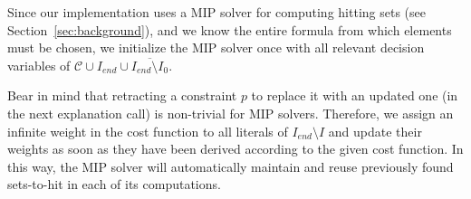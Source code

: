 \documentclass[twoside,11pt]{article}
\newcommand\m[1]{\mathcal{#1}}
\newcommand\comment[1]{\marginpar{\tiny #1}}
\renewcommand\comment[1]{#1}
\newcommand{\emilio}[1]{{\comment{\color{red}Emilio: #1}}}
\newcommand{\bart}[1]{{\comment{\color{OliveGreen}Bart: #1}}}
\newcommand\Iend{\ensuremath{I_\mathit{end} }\xspace}
\begin{document}
Since our implementation uses a MIP solver for computing hitting sets (see Section~\ref{sec:background}), and we know the entire formula from which elements must be chosen,%
we initialize the MIP solver once with all relevant decision variables of $\m{C}\cup \Iend \cup \overline{\Iend \setminus I_0}$. 

Bear in mind that retracting a constraint $p$ to replace it with an updated one (in the next explanation call) is non-trivial for MIP solvers. 
Therefore, we assign an infinite weight in the cost function to all literals of $\Iend\setminus I$ and update their weights as soon as they have been derived according to the given cost function.
In this way, the MIP solver will automatically maintain and reuse previously found sets-to-hit in each of its computations. 

\end{document}
